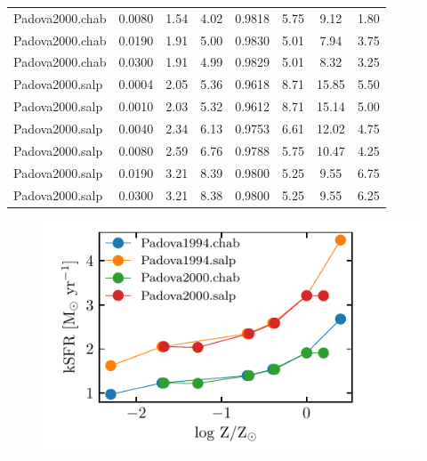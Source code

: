 \documentclass[12pt,letterpaper,usenatbib,useAMS]{article}
\def\Ha{\ifmmode \mathrm{H}\alpha \else H$\alpha$\xspace \fi}
\begin{document}
\begin{table}
{\begin{threeparttable}
\begin{tabular}{l|c|c|c|c|c|c|c}
            Padova2000.chab & 0.0080 & 1.54 & 4.02 & 0.9818 & 5.75 & 9.12 & 1.80 \\
            Padova2000.chab & 0.0190 & 1.91 & 5.00 & 0.9830 & 5.01 & 7.94 & 3.75 \\
            Padova2000.chab & 0.0300 & 1.91 & 4.99 & 0.9829 & 5.01 & 8.32 & 3.25 \\
            Padova2000.salp & 0.0004 & 2.05 & 5.36 & 0.9618 & 8.71 & 15.85 & 5.50 \\
            Padova2000.salp & 0.0010 & 2.03 & 5.32 & 0.9612 & 8.71 & 15.14 & 5.00 \\
            Padova2000.salp & 0.0040 & 2.34 & 6.13 & 0.9753 & 6.61 & 12.02 & 4.75 \\
            Padova2000.salp & 0.0080 & 2.59 & 6.76 & 0.9788 & 5.75 & 10.47 & 4.25 \\
            Padova2000.salp & 0.0190 & 3.21 & 8.39 & 0.9800 & 5.25 & 9.55 & 6.75 \\
            Padova2000.salp & 0.0300 & 3.21 & 8.38 & 0.9800 & 5.25 & 9.55 & 6.25 \\
            \hline   
        \end{tabular}
    \end{threeparttable}
    }
    \label{tab:k}
\end{table}

\begin{figure}
    \includegraphics[width=\textwidth]{logZ_kSFR_bases.pdf}
    \caption{}
    \label{fig:k}
\end{figure}






\end{document}

